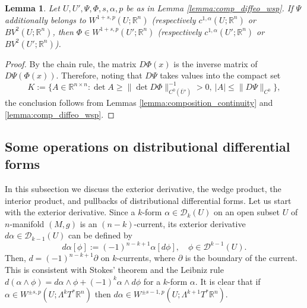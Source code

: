 \documentclass[12pt]{article}
\newcommand{\R}{\mathbb{R}}
\theoremstyle{plain}
\newtheorem{lemma}[theorem]{Lemma}
\numberwithin{equation}{section}
\begin{document}
\begin{lemma} \label{lemma:inverse_wsp}
    Let $U, U', \Psi, \Phi, s, \alpha, p$ be as in Lemma \ref{lemma:comp_diffeo_wsp}. If $\Psi$ additionally belongs to $W^{1+s,p}(U; \R^n)$ (respectively $c^{1,\alpha}(U; \R^n)$ or $BV^2(U;\R^n)$, then $\Phi \in W^{1+s,p}(U'; \R^n)$ (respectively $c^{1,\alpha}(U';\R^n)$ or $BV^2(U';\R^n)$).
\end{lemma}
\begin{proof}
    By the chain rule, the matrix $D\Phi(x)$ is the inverse matrix of $D\Psi(\Phi(x))$. Therefore, noting that $D\Psi$ takes values into the compact set
    \begin{equation*}
        K := \{ A \in \R^{n\times n} : \det A \geq \|\det D\Phi\|_{C^0(\overline U')}^{-1} > 0, \ |A| \leq \|D\Psi\|_{C^0}\},
    \end{equation*}
    the conclusion follows from Lemmas \ref{lemma:composition_continuity} and \ref{lemma:comp_diffeo_wsp}.
\end{proof}

\subsection{Some operations on distributional differential forms} \label{sec:forms_ops}
    
In this subsection we discuss the exterior derivative, the wedge product, the interior product, and pullbacks of distributional differential forms. Let us start with the exterior derivative. Since a $k$-form $\alpha \in \mathcal{D}_k(U)$ on an open subset $U$ of $n$-manifold $(M,g)$ is an $(n-k)$-current, its exterior derivative $d\alpha \in \mathcal{D}_{k-1}(U)$ can be defined by
\begin{equation*}
    d\alpha [\phi] := (-1)^{n-k+1}\alpha [d\phi], \quad \phi \in \mathcal{D}^{k-1}(U).
\end{equation*}
Then, $d = (-1)^{n-k+1}\partial$ on $k$-currents, where $\partial$ is the boundary of the current. This is consistent with Stokes' theorem and the Leibniz rule $d(\alpha \wedge \phi) = d\alpha \wedge \phi + (-1)^{k} \alpha \wedge d\phi$ for a $k$-form $\alpha$. It is clear that if $\alpha \in W^{\pm s,p}(U;\Lambda^k T^* \R^n)$ then $d\alpha \in W^{\pm s-1,p}(U;\Lambda^{k+1} T^* \R^n)$.
\end{document}
